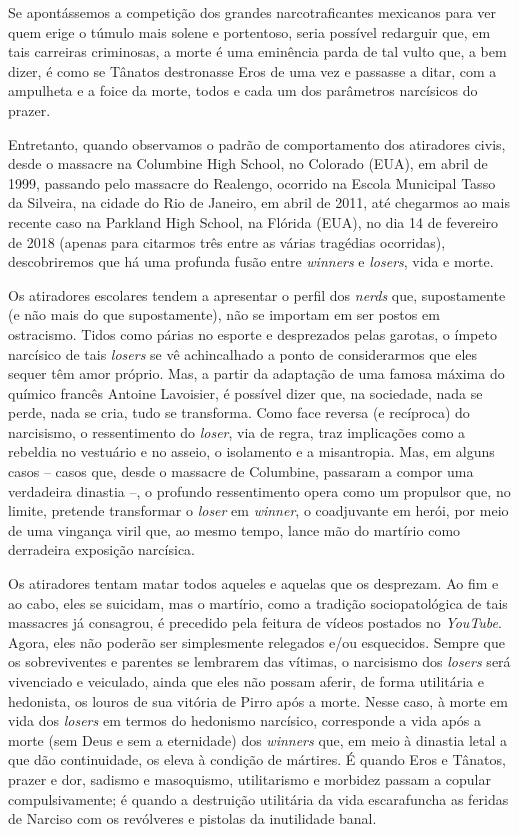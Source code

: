 Se apontássemos a competição dos grandes narcotraficantes mexicanos para
ver quem erige o túmulo mais solene e portentoso, seria possível
redarguir que, em tais carreiras criminosas, a morte é uma eminência
parda de tal vulto que, a bem dizer, é como se Tânatos destronasse Eros
de uma vez e passasse a ditar, com a ampulheta e a foice da morte, todos
e cada um dos parâmetros narcísicos do prazer.

Entretanto, quando observamos o padrão de comportamento dos atiradores
civis, desde o massacre na Columbine High School, no Colorado (EUA), em
abril de 1999, passando pelo massacre do Realengo, ocorrido na Escola
Municipal Tasso da Silveira, na cidade do Rio de Janeiro, em abril de
2011, até chegarmos ao mais recente caso na Parkland High School, na
Flórida (EUA), no dia 14 de fevereiro de 2018 (apenas para citarmos três
entre as várias tragédias ocorridas), descobriremos que há uma profunda
fusão entre \emph{winners} e \emph{losers}, vida e morte.

Os atiradores escolares tendem a apresentar o perfil dos \emph{nerds}
que, supostamente (e não mais do que supostamente), não se importam em
ser postos em ostracismo. Tidos como párias no esporte e desprezados
pelas garotas, o ímpeto narcísico de tais \emph{losers} se vê
achincalhado a ponto de considerarmos que eles sequer têm amor próprio.
Mas, a partir da adaptação de uma famosa máxima do químico francês
Antoine Lavoisier, é possível dizer que, na sociedade, nada se perde,
nada se cria, tudo se transforma. Como face reversa (e recíproca) do
narcisismo, o ressentimento do \emph{loser}, via de regra, traz
implicações como a rebeldia no vestuário e no asseio, o isolamento e a
misantropia. Mas, em alguns casos -- casos que, desde o massacre de
Columbine, passaram a compor uma verdadeira dinastia --, o profundo
ressentimento opera como um propulsor que, no limite, pretende
transformar o \emph{loser} em \emph{winner}, o coadjuvante em herói, por
meio de uma vingança viril que, ao mesmo tempo, lance mão do martírio
como derradeira exposição narcísica.

Os atiradores tentam matar todos aqueles e aquelas que os desprezam. Ao
fim e ao cabo, eles se suicidam, mas o martírio, como a tradição
sociopatológica de tais massacres já consagrou, é precedido pela feitura
de vídeos postados no \emph{YouTube}. Agora, eles não poderão ser
simplesmente relegados e/ou esquecidos. Sempre que os sobreviventes e
parentes se lembrarem das vítimas, o narcisismo dos \emph{losers} será
vivenciado e veiculado, ainda que eles não possam aferir, de forma
utilitária e hedonista, os louros de sua vitória de Pirro após a morte.
Nesse caso, à morte em vida dos \emph{losers} em termos do hedonismo
narcísico, corresponde a vida após a morte (sem Deus e sem a eternidade)
dos \emph{winners} que, em meio à dinastia letal a que dão continuidade,
os eleva à condição de mártires. É quando Eros e Tânatos, prazer e dor,
sadismo e masoquismo, utilitarismo e morbidez passam a copular
compulsivamente; é quando a destruição utilitária da vida escarafuncha
as feridas de Narciso com os revólveres e pistolas da inutilidade banal.

